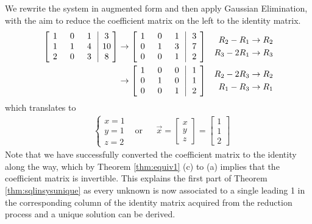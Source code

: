 \begin{solution}
We rewrite the system in augmented form and then apply Gaussian Elimination, with the aim to reduce the coefficient matrix on the left to the identity matrix.
\begin{align*}
\left[\begin{array}{@{\,}wc{10pt}wc{10pt}wc{10pt}|wc{10pt}@{\,}}
1 & 0 & 1 & 3 \\
1 & 1 & 4 & 10 \\
2 & 0 & 3 & 8
\end{array}\right] 
& \to 
\left[\begin{array}{@{\,}wc{10pt}wc{10pt}wc{10pt}|wc{10pt}@{\,}}
1 & 0 & 1 & 3 \\
0 & 1 & 3 & 7 \\
0 & 0 & 1 & 2
\end{array}\right] 
& \begin{aligned}
R_2-R_1 &\to R_2 \\
R_3-2R_1 &\to R_3 
\end{aligned} \\
& \to 
\left[\begin{array}{@{\,}wc{10pt}wc{10pt}wc{10pt}|wc{10pt}@{\,}}
1 & 0 & 0 & 1 \\
0 & 1 & 0 & 1 \\
0 & 0 & 1 & 2
\end{array}\right] 
& 
\begin{aligned}
R_2-2R_3 &\to R_2 \\
R_1-R_3 &\to R_1    
\end{aligned}
\end{align*}
which translates to
\begin{align*}
&
\begin{cases}
x = 1 \\
y = 1 \\
z = 2
\end{cases}
& \text{or} &
& \vec{x} = 
\begin{bmatrix}
x \\
y \\
z
\end{bmatrix}
=
\begin{bmatrix}
1 \\
1 \\
2
\end{bmatrix}
\end{align*}
Note that we have successfully converted the coefficient matrix to the identity along the way, which by Theorem \ref{thm:equiv1} (c) to (a) implies that the coefficient matrix is invertible. This explains the first part of Theorem \ref{thm:sqlinsysunique} as every unknown is now associated to a single leading 1 in the corresponding column of the identity matrix acquired from the reduction process and a unique solution can be derived.
\end{solution}

